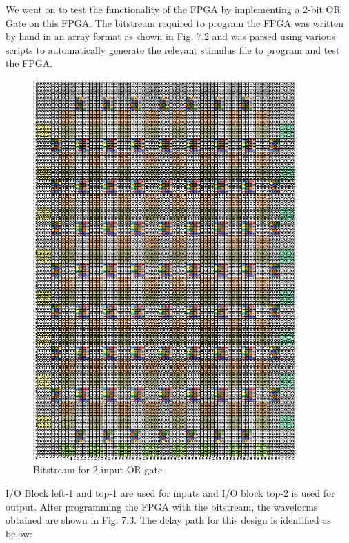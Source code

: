 We went on to test the functionality of the FPGA by implementing a 2-bit OR Gate on this FPGA. The bitstream required to program the FPGA was written by hand in an array format as shown in Fig. 7.2 and was parsed using various scripts to automatically generate the relevant stimulus file to program and test the FPGA.

\begin{figure}[H]
\centering
\includegraphics[width=0.9\textwidth]{fpga_bitstream.png}
\caption{Bitstream for 2-input OR gate}
\label{fig:Figure}
\end{figure}

I/O Block left-1 and top-1 are used for inputs and I/O block top-2 is used for output. After programming the FPGA with the bitstream, the waveforms obtained are shown in Fig. 7.3. The delay path for this design is identified as below:

